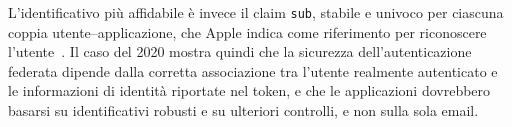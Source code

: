 L'identificativo più affidabile è invece il claim \texttt{sub}, stabile e
univoco per ciascuna coppia utente--applicazione, che Apple indica come
riferimento per riconoscere l'utente~\cite{apple-verifying-user,openid-connect-core}.
Il caso del 2020 mostra quindi che la sicurezza dell'autenticazione federata
dipende dalla corretta associazione tra l'utente realmente autenticato e le
informazioni di identità riportate nel token, e che le applicazioni dovrebbero
basarsi su identificativi robusti e su ulteriori controlli, e non sulla sola
email.